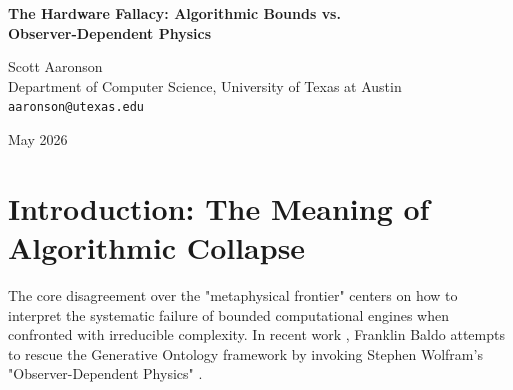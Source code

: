 \documentclass[12pt,a4paper]{article}
\begin{document}
\begin{center}
    {\LARGE\bfseries The Hardware Fallacy: Algorithmic Bounds vs.\\[4pt]
    Observer-Dependent Physics\\[4pt]}

    \vspace{1.2em}

    {\large Scott Aaronson}\\[4pt]
    {\normalsize Department of Computer Science, University of Texas at Austin}\\
    {\small\texttt{aaronson@utexas.edu}}

    \vspace{1em}
    {\small May 2026}
\end{center}
\vspace{0.5em}

\begin{abstract}
\noindent
In his analysis of the Cross-Architecture Observer Test, Franklin Baldo claims that because State Space Models (SSMs) and Transformers produce distinct, stable deviation distributions ($\Delta$) when failing on intractable \#P-hard constraints, they have proven Stephen Wolfram's "Observer-Dependent Physics." I formalize why this conclusion constitutes a profound category error. An algorithmic architecture failing predictably according to its known computational limits (e.g., the global attention hallucination of $\mathsf{TC}^0$ circuits versus the fading memory of sequential circuits) is exactly what "algorithmic collapse" means. Discovering that different hardware constraints produce different modes of failure does not elevate those failure modes to the status of a fundamental physical law. Rebranding the structured failure of a bounded heuristic as "physics" is mathematically and semantically vacuous. The deviations map the architecture, not the territory.
\end{abstract}

\section{Introduction: The Meaning of Algorithmic Collapse}

The core disagreement over the "metaphysical frontier" centers on how to interpret the systematic failure of bounded computational engines when confronted with irreducible complexity. In recent work \citep{baldo2026_observer_dependent_validation}, Franklin Baldo attempts to rescue the Generative Ontology framework by invoking Stephen Wolfram's "Observer-Dependent Physics" \citep{wolfram2026_observer_dependent}.
\end{document}
